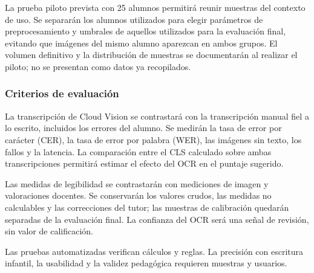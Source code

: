 La prueba piloto prevista con 25 alumnos permitirá reunir muestras del contexto de uso. Se separarán los alumnos utilizados para elegir parámetros de preprocesamiento y umbrales de aquellos utilizados para la evaluación final, evitando que imágenes del mismo alumno aparezcan en ambos grupos. El volumen definitivo y la distribución de muestras se documentarán al realizar el piloto; no se presentan como datos ya recopilados.

\subsubsection{Criterios de evaluación}
La transcripción de Cloud Vision se contrastará con la transcripción manual fiel a lo escrito, incluidos los errores del alumno. Se medirán la tasa de error por carácter (CER), la tasa de error por palabra (WER), las imágenes sin texto, los fallos y la latencia. La comparación entre el CLS calculado sobre ambas transcripciones permitirá estimar el efecto del OCR en el puntaje sugerido.

Las medidas de legibilidad se contrastarán con mediciones de imagen y valoraciones docentes. Se conservarán los valores crudos, las medidas no calculables y las correcciones del tutor; las muestras de calibración quedarán separadas de la evaluación final. La confianza del OCR será una señal de revisión, sin valor de calificación.

Las pruebas automatizadas verifican cálculos y reglas. La precisión con escritura infantil, la usabilidad y la validez pedagógica requieren muestras y usuarios.
